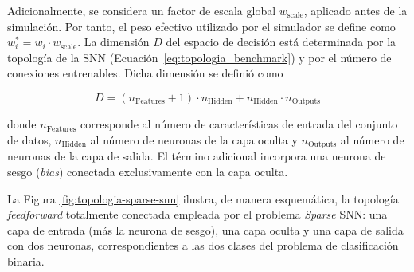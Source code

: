 Adicionalmente, se considera un factor de escala global $w_{\text{scale}}$, aplicado antes de la simulación. Por tanto, el peso efectivo utilizado por el simulador se define como $w_i^{\ast} = w_i \cdot w_{\text{scale}}$. La dimensión $D$ del espacio de decisión está determinada por la topología de la SNN (Ecuación~\ref{eq:topologia_benchmark}) y por el número de conexiones entrenables. Dicha dimensión se definió como

\begin{equation}
D = (n_{\text{Features}} + 1)\cdot n_{\text{Hidden}}
+ n_{\text{Hidden}}\cdot n_{\text{Outputs}}
\label{eq:decision_dimension}
\end{equation}

donde $n_{\text{Features}}$ corresponde al número de características de entrada del conjunto de datos, $n_{\text{Hidden}}$ al número de neuronas de la capa oculta y $n_{\text{Outputs}}$ al número de neuronas de la capa de salida. El término adicional incorpora una neurona de sesgo (\textit{bias}) conectada exclusivamente con la capa oculta.

La Figura \ref{fig:topologia-sparse-snn} ilustra, de manera esquemática, la topología \textit{feedforward} totalmente conectada empleada por el problema \textit{Sparse} SNN: una capa de entrada (más la neurona de sesgo), una capa oculta y una capa de salida con dos neuronas, correspondientes a las dos clases del problema de clasificación binaria.

